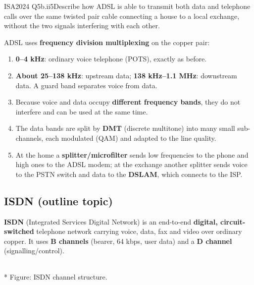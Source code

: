 \documentclass[10pt]{article}
\begin{document}
\begin{pastq}{ISA2024 Q5b.ii}{5}Describe how ADSL is able to transmit both data and telephone calls over the same twisted pair cable connecting a house to a local exchange, without the two signals interfering with each other.\end{pastq}
\begin{ans}
ADSL uses \textbf{frequency division multiplexing} on the copper pair:
\begin{enumerate}
\item \textbf{0--4 kHz}: ordinary voice telephone (POTS), exactly as before.
\item \textbf{About 25--138 kHz}: upstream data; \textbf{138 kHz--1.1 MHz}: downstream data. A guard band separates voice from data.
\item Because voice and data occupy \textbf{different frequency bands}, they do not interfere and can be used at the same time.
\item The data bands are split by \textbf{DMT} (discrete multitone) into many small sub-channels, each modulated (QAM) and adapted to the line quality.
\item At the home a \textbf{splitter/microfilter} sends low frequencies to the phone and high ones to the ADSL modem; at the exchange another splitter sends voice to the PSTN switch and data to the \textbf{DSLAM}, which connects to the ISP.
\end{enumerate}
\end{ans}

\subsection{ISDN (outline topic)}
\textbf{ISDN} (Integrated Services Digital Network) is an end-to-end \textbf{digital, circuit-switched} telephone network carrying voice, data, fax and video over ordinary copper. It uses \textbf{B channels} (bearer, 64 kbps, user data) and a \textbf{D channel} (signalling/control).

\begin{center}
\begin{minipage}{\linewidth}\centering
{}\\*
{\scriptsize\color{midgrey}Figure: ISDN channel structure.}\end{minipage}
\end{center}
\end{document}
